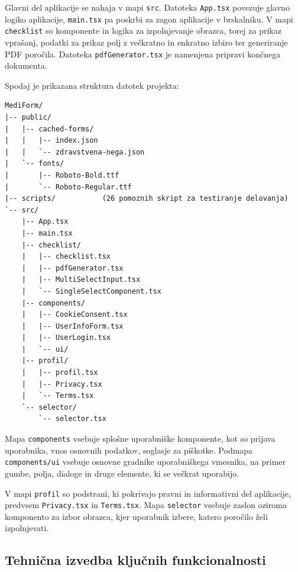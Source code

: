 \documentclass[12pt,a4paper]{article}
\begin{document}
Glavni del aplikacije se nahaja v mapi \texttt{src}. Datoteka \texttt{App.tsx} povezuje glavno logiko aplikacije, \texttt{main.tsx} pa poskrbi za zagon aplikacije v brskalniku. V mapi \texttt{checklist} so komponente in logika za izpolnjevanje obrazca, torej za prikaz vpra\v{s}anj, podatki za prikaz polj z ve\v{c}kratno in enkratno izbiro ter generiranje PDF poro\v{c}ila. Datoteka \texttt{pdfGenerator.tsx} je namenjena pripravi kon\v{c}nega dokumenta.


Spodaj je prikazana struktura datotek projekta:

\begin{center}
\begin{minipage}{0.85\textwidth}
\ttfamily\small
\begin{verbatim}
MediForm/
|-- public/
|   |-- cached-forms/
|   |   |-- index.json
|   |   `-- zdravstvena-nega.json
|   `-- fonts/
|       |-- Roboto-Bold.ttf
|       `-- Roboto-Regular.ttf
|-- scripts/           (26 pomoznih skript za testiranje delovanja)
`-- src/
    |-- App.tsx
    |-- main.tsx
    |-- checklist/
    |   |-- checklist.tsx
    |   |-- pdfGenerator.tsx
    |   |-- MultiSelectInput.tsx
    |   `-- SingleSelectComponent.tsx
    |-- components/
    |   |-- CookieConsent.tsx
    |   |-- UserInfoForm.tsx
    |   |-- UserLogin.tsx
    |   `-- ui/
    |-- profil/
    |   |-- profil.tsx
    |   |-- Privacy.tsx
    |   `-- Terms.tsx
    `-- selector/
        `-- selector.tsx
\end{verbatim}
\end{minipage}
\end{center}


Mapa \texttt{components} vsebuje splo\v{s}ne uporabni\v{s}ke komponente, kot so prijava uporabnika, vnos osnovnih podatkov, soglasje za pi\v{s}kotke. Podmapa \texttt{components/ui} vsebuje osnovne gradnike uporabni\v{s}kega vmesnika, na primer gumbe, polja, dialoge in druge elemente, ki se večkrat uporabijo.

V mapi \texttt{profil} so podstrani, ki pokrivajo pravni in informativni del aplikacije, predvsem \texttt{Privacy.tsx} in \texttt{Terms.tsx}. Mapa \texttt{selector} vsebuje zaslon oziroma komponento za izbor obrazca, kjer uporabnik izbere, katero poro\v{c}ilo \v{z}eli izpolnjevati.


\subsection{Tehni\v{c}na izvedba klju\v{c}nih funkcionalnosti}
\end{document}
